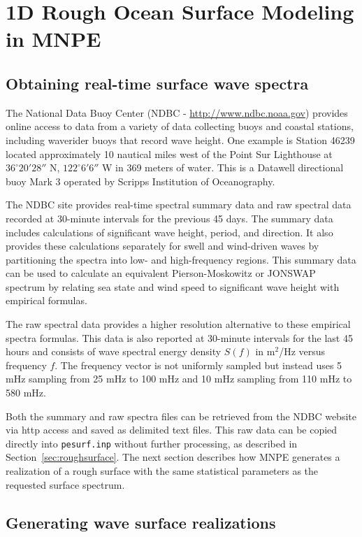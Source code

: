 \section{1D Rough Ocean Surface Modeling in MNPE}\label{app:roughsurface}

\subsection{Obtaining real-time surface wave spectra}

The National Data Buoy Center (NDBC - \url{http://www.ndbc.noaa.gov}) provides online access to data from a variety of data collecting buoys and coastal stations, including waverider buoys that record wave height. One example is Station 46239 located approximately 10 nautical miles west of the Point Sur Lighthouse at $36^\circ 20'28''$ N, $122^\circ 6'6''$ W in 369 meters of water. This is a Datawell directional buoy Mark 3 operated by Scripps Institution of Oceanography.

The NDBC site provides real-time spectral summary data and raw spectral data recorded at 30-minute intervals for the previous 45 days. The summary data includes calculations of significant wave height, period, and direction. It also provides these calculations separately for swell and wind-driven waves by partitioning the spectra into low- and high-frequency regions. This summary data can be used to calculate an equivalent Pierson-Moskowitz\cite{PM} or JONSWAP\cite{JONSWAP} spectrum by relating sea state and wind speed to significant wave height with empirical formulas\cite{Hodges}.

The raw spectral data provides a higher resolution alternative to these empirical spectra formulas. This data is also reported at 30-minute intervals for the last 45 hours and consists of wave spectral energy density $S(f)$ in m$^2$/Hz versus frequency $f$. The frequency vector is not uniformly sampled but instead uses 5 mHz sampling from 25 mHz to 100 mHz and 10 mHz sampling from 110 mHz to 580 mHz.

Both the summary and raw spectra files can be retrieved from the NDBC website via http access and saved as delimited text files. This raw data can be copied directly into \texttt{pesurf.inp} without further processing, as described in Section~\ref{sec:roughsurface}. The next section describes how MNPE generates a realization of a rough surface with the same statistical parameters as the requested surface spectrum.

\newpage
\subsection{Generating wave surface realizations}

